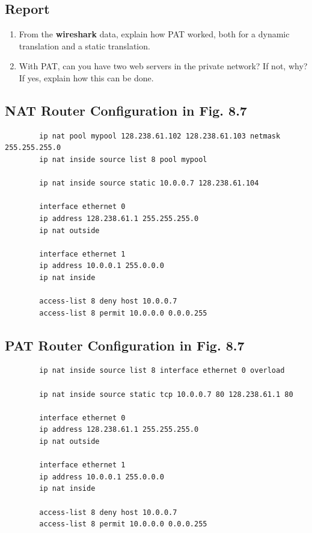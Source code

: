 \documentclass[10pt,a4paper]{article}
\numberwithin{equation}{section}
\numberwithin{figure}{section}
\numberwithin{table}{section}
\begin{document}
    \subsection*{Report}
    \begin{enumerate}
        \item From the \textbf{wireshark} data, explain how PAT worked, both for a dynamic translation and a static translation.
        \item With PAT, can you have two web servers in the private network?
        If not, why?
        If yes, explain how this can be done.
    \end{enumerate}

    \subsection*{NAT Router Configuration in Fig. 8.7}
    \begin{verbatim}
        ip nat pool mypool 128.238.61.102 128.238.61.103 netmask 255.255.255.0
        ip nat inside source list 8 pool mypool

        ip nat inside source static 10.0.0.7 128.238.61.104

        interface ethernet 0
        ip address 128.238.61.1 255.255.255.0
        ip nat outside

        interface ethernet 1
        ip address 10.0.0.1 255.0.0.0
        ip nat inside

        access-list 8 deny host 10.0.0.7
        access-list 8 permit 10.0.0.0 0.0.0.255
    \end{verbatim}
    \subsection*{PAT Router Configuration in Fig. 8.7}
    \begin{verbatim}
        ip nat inside source list 8 interface ethernet 0 overload

        ip nat inside source static tcp 10.0.0.7 80 128.238.61.1 80

        interface ethernet 0
        ip address 128.238.61.1 255.255.255.0
        ip nat outside

        interface ethernet 1
        ip address 10.0.0.1 255.0.0.0
        ip nat inside

        access-list 8 deny host 10.0.0.7
        access-list 8 permit 10.0.0.0 0.0.0.255
    \end{verbatim}
\end{document}
